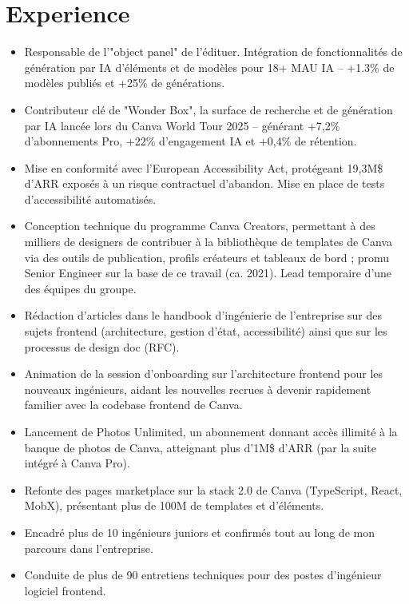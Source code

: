 \documentclass[11pt,a4paper,sans]{moderncv} %
\begin{document}
\maketitle %
\vspace*{-12mm}



\section{Experience}

{\begin{itemize}
    \item Responsable de l'"object panel" de l'édituer. Intégration de fonctionnalités de génération par IA d'éléments et de modèles pour 18+ MAU IA -- +1.3\% de modèles publiés et +25\% de générations.
    \item Contributeur clé de "Wonder Box", la surface de recherche et de génération par IA lancée lors du Canva World Tour 2025 -- générant +7,2\% d'abonnements Pro, +22\% d'engagement IA et +0,4\% de rétention.
    \item Mise en conformité avec l'European Accessibility Act, protégeant 19,3M\$ d'ARR exposés à un risque contractuel d'abandon. Mise en place de tests d'accessibilité automatisés.
    \item Conception technique du programme Canva Creators, permettant à des milliers de designers de contribuer à la bibliothèque de templates de Canva via des outils de publication, profils créateurs et tableaux de bord ; promu Senior Engineer sur la base de ce travail (ca. 2021). Lead temporaire d'une des équipes du groupe.
    \item Rédaction d'articles dans le handbook d'ingénierie de l'entreprise sur des sujets frontend (architecture, gestion d'état, accessibilité) ainsi que sur les processus de design doc (RFC).
    \item Animation de la session d'onboarding sur l'architecture frontend pour les nouveaux ingénieurs, aidant les nouvelles recrues à devenir rapidement familier avec la codebase frontend de Canva.
    \item Lancement de Photos Unlimited, un abonnement donnant accès illimité à la banque de photos de Canva, atteignant plus d'1M\$ d'ARR (par la suite intégré à Canva Pro).
    \item Refonte des pages marketplace sur la stack 2.0 de Canva (TypeScript, React, MobX), présentant plus de 100M de templates et d'éléments.
    \item Encadré plus de 10 ingénieurs juniors et confirmés tout au long de mon parcours dans l'entreprise.
    \item Conduite de plus de 90 entretiens techniques pour des postes d'ingénieur logiciel frontend.
\end{itemize}}
\end{document}
